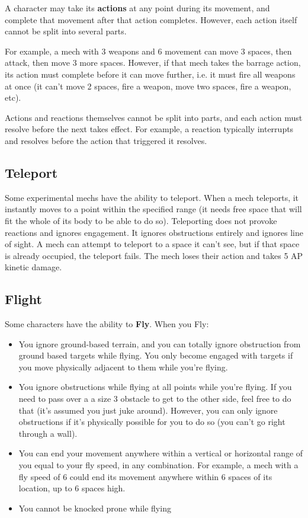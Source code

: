A character may take its \textbf{actions} at any point during its movement, and complete that movement after that action completes. However, each action itself cannot be split into several parts.

For example, a mech with 3 weapons and 6 movement can move 3 spaces, then attack, then move 3 more spaces. However, if that mech takes the barrage action, its action must complete before it can move further, i.e. it must fire all weapons at once (it can’t move 2 spaces, fire a weapon, move two spaces, fire a weapon, etc).

Actions and reactions themselves cannot be split into parts, and each action must resolve before the next takes effect. For example, a reaction typically interrupts and resolves before the action that triggered it resolves.


\subsection{Teleport}

Some experimental mechs have the ability to teleport. When a mech teleports, it instantly moves to a point within the specified range (it needs free space that will fit the whole of its body to be able to do so). Teleporting does not provoke reactions and ignores engagement. It ignores obstructions entirely and ignores line of sight. A mech can attempt to teleport to a space it can’t see, but if that space is already occupied, the teleport fails. The mech loses their action and takes 5 AP kinetic damage.

\subsection{Flight}

Some characters have the ability to \textbf{Fly}. When you Fly:

\begin{itemize}
\item You ignore ground-based terrain, and you can totally ignore obstruction from ground based targets while flying. You only become engaged with targets if you move physically adjacent to them while you’re flying.
\item You ignore obstructions while flying at all points while you’re flying. If you need to pass over a a size 3 obstacle to get to the other side, feel free to do that (it’s assumed you just juke around). However, you can only ignore obstructions if it’s physically possible for you to do so (you can’t go right through a wall).
\item You can end your movement anywhere within a vertical or horizontal range of you equal to your fly speed, in any combination. For example, a mech with a fly speed of 6 could end its movement anywhere within 6 spaces of its location, up to 6 spaces high.
\item You cannot be knocked prone while flying
\end{itemize}

